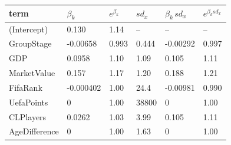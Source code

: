 
\begin{tabular}{llllll}
\toprule
term & $\beta_k$ & $e^{\beta_k}$ & $sd_x$ & $\beta_k \, sd_x$ & $e^{\beta_k sd_x}$\\
\midrule
(Intercept) & 0.130 & 1.14 & -- & -- & --\\
GroupStage & -0.00658 & 0.993 & 0.444 & -0.00292 & 0.997\\
GDP & 0.0958 & 1.10 & 1.09 & 0.105 & 1.11\\
MarketValue & 0.157 & 1.17 & 1.20 & 0.188 & 1.21\\
FifaRank & -0.000402 & 1.00 & 24.4 & -0.00981 & 0.990\\
UefaPoints & 0 & 1.00 & 38800 & 0 & 1.00\\
CLPlayers & 0.0262 & 1.03 & 3.99 & 0.105 & 1.11\\
AgeDifference & 0 & 1.00 & 1.63 & 0 & 1.00\\
\bottomrule
\end{tabular}
